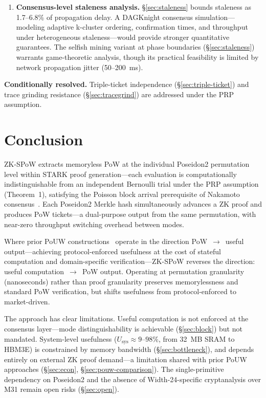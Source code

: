 \documentclass[11pt,a4paper]{article}
\begin{document}
\begin{enumerate}
\item \textbf{Consensus-level staleness analysis.} \S\ref{sec:staleness} bounds staleness as 1.7--6.8\% of propagation delay. A DAGKnight consensus simulation---modeling adaptive k-cluster ordering, confirmation times, and throughput under heterogeneous staleness---would provide stronger quantitative guarantees. The selfish mining variant at phase boundaries (\S\ref{sec:staleness}) warrants game-theoretic analysis, though its practical feasibility is limited by network propagation jitter (50--200~ms).
\end{enumerate}

\textbf{Conditionally resolved.} Triple-ticket independence (\S\ref{sec:triple-ticket}) and trace grinding resistance (\S\ref{sec:tracegrind}) are addressed under the PRP assumption.

\section{Conclusion}

ZK-SPoW extracts memoryless PoW at the individual Poseidon2 permutation level within STARK proof generation---each evaluation is computationally indistinguishable from an independent Bernoulli trial under the PRP assumption (Theorem~1), satisfying the Poisson block arrival prerequisite of Nakamoto consensus~\cite{dagknight,nakamoto}. Each Poseidon2 Merkle hash simultaneously advances a ZK proof and produces PoW tickets---a dual-purpose output from the same permutation, with near-zero throughput switching overhead between modes.

Where prior PoUW constructions~\cite{ball2017,komargodski2025} operate in the direction PoW~$\to$~useful output---achieving protocol-enforced usefulness at the cost of stateful computation and domain-specific verification---ZK-SPoW reverses the direction: useful computation~$\to$~PoW output. Operating at permutation granularity (nanoseconds) rather than proof granularity preserves memorylessness and standard PoW verification, but shifts usefulness from protocol-enforced to market-driven.

The approach has clear limitations. Useful computation is not enforced at the consensus layer---mode distinguishability is achievable (\S\ref{sec:block}) but not mandated. System-level usefulness ($U_{\mathrm{sys}} \approx 9$--$98\%$, from 32~MB SRAM to HBM3E) is constrained by memory bandwidth (\S\ref{sec:bottleneck}), and depends entirely on external ZK proof demand---a limitation shared with prior PoUW approaches (\S\ref{sec:econ}, \S\ref{sec:pouw-comparison}). The single-primitive dependency on Poseidon2 and the absence of Width-24-specific cryptanalysis over M31 remain open risks (\S\ref{sec:open}).
\end{document}
